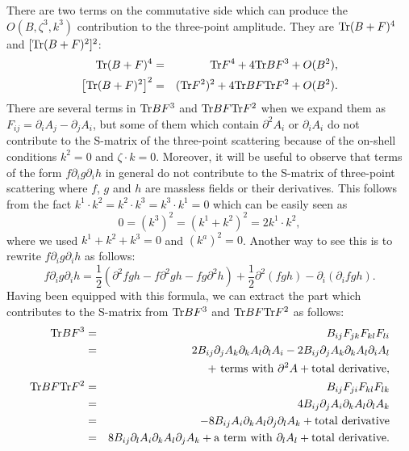 \documentclass[a4paper,12pt]{article}
\begin{document}
There are two terms on the commutative side
which can produce the $O(B, \zeta^3, k^3)$ contribution
to the three-point amplitude.
They are ${\rm Tr} (B+F)^4$ and $[{\rm Tr} (B+F)^2]^2$:
\begin{eqnarray}
{\rm Tr} (B+F)^4 &=& {\rm Tr} F^4
+ 4 {\rm Tr} BF^3 + O(B^2), \\
\left[{\rm Tr} (B+F)^2 \right]^2
&=& ( {\rm Tr} F^2 )^2
+ 4 {\rm Tr} BF {\rm Tr} F^2 + O(B^2).
\end{eqnarray}
There are several terms in ${\rm Tr} BF^3$
and ${\rm Tr} BF {\rm Tr} F^2$
when we expand them as $F_{ij} = \partial_i A_j - \partial_j A_i$,
but some of them
which contain $\partial^2 A_i$
or $\partial_i A_i$ do not contribute to the S-matrix
of the three-point scattering
because of the on-shell conditions
$k^2 =0$ and $\zeta \cdot k =0$.
Moreover, it will be useful to observe that
terms of the form $f \partial_i g \partial_i h$ in general
do not contribute to the S-matrix of three-point scattering
where $f$, $g$ and $h$ are massless fields or their derivatives.
This follows from the fact
$k^1 \cdot k^2 = k^2 \cdot k^3 = k^3 \cdot k^1 =0$
which can be easily seen as
\begin{equation}
0 = ( k^3 )^2 = ( k^1 + k^2 )^2 = 2 k^1 \cdot k^2,
\end{equation}
where we used $k^1 + k^2 + k^3 =0$ and $( k^a )^2 =0$.
Another way to see this is to rewrite $f \partial_i g \partial_i h$
as follows:
\begin{equation}
f \partial_i g \partial_i h
= \frac{1}{2}
(\partial^2 f g h - f \partial^2 g h - f g \partial^2 h)
+ \frac{1}{2} \partial^2 (f g h) - \partial_i ( \partial_i f  g h).
\label{formula}
\end{equation}
Having been equipped with this formula,
we can extract the part which contributes to the S-matrix from
${\rm Tr} BF^3$ and ${\rm Tr} BF {\rm Tr} F^2$ as follows:
\begin{eqnarray}
{\rm Tr} BF^3 &=& B_{ij} F_{jk} F_{kl} F_{li}
\nonumber \\
&=& 2 B_{ij} \partial_j A_k \partial_k A_l \partial_l A_i
-2 B_{ij} \partial_j A_k \partial_k A_l \partial_i A_l
\nonumber \\
&& + {\rm ~terms~with~} \partial^2 A
+ {\rm total~derivative},
\\
{\rm Tr} BF {\rm Tr} F^2 &=& B_{ij} F_{ji} F_{kl} F_{lk}
\nonumber \\
&=& 4 B_{ij} \partial_j A_i \partial_k A_l \partial_l A_k
\nonumber \\
&=& -8 B_{ij} A_i \partial_k A_l \partial_j \partial_l A_k
+ {\rm total~derivative}
\nonumber \\
&=& 8 B_{ij} \partial_l A_i \partial_k A_l \partial_j A_k
+ {\rm a~term~with~} \partial_l A_l
+ {\rm total~derivative}.
\end{eqnarray}
\end{document}
